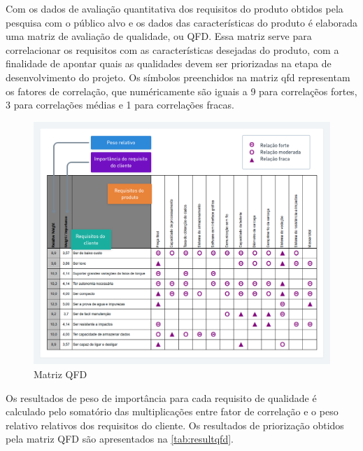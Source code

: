 Com os dados de avaliação quantitativa dos requisitos do produto obtidos pela pesquisa com o público alvo e os dados das características do produto é elaborada uma matriz de
avaliação de qualidade, ou QFD. Essa matriz serve para correlacionar os requisitos com as características desejadas do produto, com a finalidade de apontar quais as qualidades
devem ser priorizadas na etapa de desenvolvimento do projeto.
Os símbolos preenchidos na matriz qfd representam os fatores de correlação, que numéricamente são iguais a 9 para correlaçẽos fortes, 3 para correlações médias e 1 para correlações fracas.

\begin{figure}[htb]
	\caption{\label{fig:2032} Matriz QFD}
	\begin{center}
		\includegraphics[width=\textwidth]{pictures/2032.png}
	\end{center}
\end{figure}

Os resultados de peso de importância para cada requisito de qualidade é calculado pelo somatório das multiplicações entre fator de correlação e o peso relativo relativos dos requisitos do cliente.
Os resultados de priorização obtidos pela matriz QFD são apresentados na \autoref{tab:resultqfd}.


